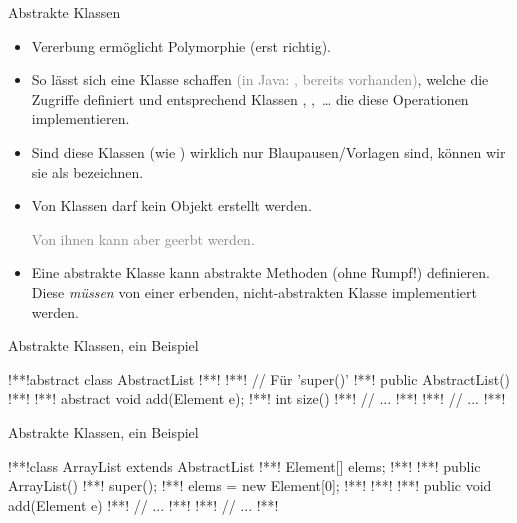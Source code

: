 \begin{frame}{Abstrakte Klassen}
    \begin{itemize}[<+(1)->]
        \widei
        \item Vererbung ermöglicht Polymorphie (erst richtig).
        \item So lässt sich eine Klasse  schaffen \textcolor{gray}{(in Java: , bereits vorhanden)}, welche die Zugriffe definiert und entsprechend Klassen , ,~\ldots\pause{} die diese Operationen implementieren.
        \item Sind diese Klassen (wie ) wirklich nur Blaupausen/\allowbreak Vorlagen sind,\pause{} können wir sie als  bezeichnen.
        \item Von  Klassen darf kein Objekt erstellt werden.\par\textcolor{gray}{Von ihnen kann aber geerbt werden.}
        \item Eine abstrakte Klasse kann abstrakte Methoden (ohne Rumpf!) definieren.\pause{} Diese \emph{müssen} von einer erbenden, nicht-abstrakten Klasse implementiert werden.
    \end{itemize}
\end{frame}

\begin{frame}[fragile,c]{Abstrakte Klassen, ein Beispiel}
\begin{plainjava}
!**!abstract class AbstractList {
!**!
!**!    // Für 'super()'
!**!    public AbstractList() { }
!**!
!**!    abstract void add(Element e);
!**!    int size() {
!**!        // ...
!**!    }
!**!    // ...
!**!}
\end{plainjava}
\end{frame}


\begin{frame}[fragile,c]{Abstrakte Klassen, ein Beispiel}
\begin{plainjava}
!**!class ArrayList extends AbstractList {
!**!    Element[] elems;
!**!
!**!    public ArrayList() {
!**!        super();
!**!        elems = new Element[0];
!**!    }
!**!
!**!    public void add(Element e) {
!**!        // ...
!**!    }
!**!    // ...
!**!}
\end{plainjava}
\end{frame}


